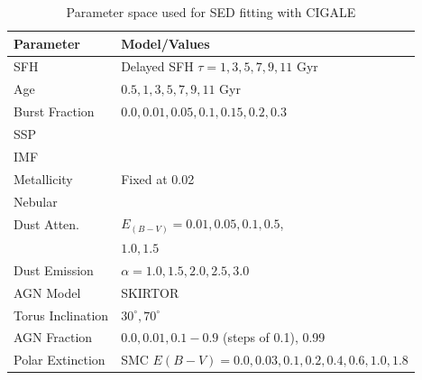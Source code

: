 \begin{table}[htbp]
    \caption{Parameter space used for SED fitting with CIGALE}
    \label{tab:parameter_space}
    \begin{center}
    \begin{tabular}{ll}
        \toprule
        \textbf{Parameter} & \textbf{Model/Values} \\ 
        \hline
        SFH                 & Delayed SFH $\tau = 1,3,5,7,9,11$ Gyr \\
        Age                 & $0.5, 1, 3, 5, 7, 9, 11$ Gyr \\
        Burst Fraction      & $0.0, 0.01, 0.05, 0.1, 0.15, 0.2, 0.3$ \\
        SSP                 & \cite{bruzual_stellar_2003} \\
        IMF                 & \cite{chabrier_galactic_2003} \\
        Metallicity         & Fixed at 0.02 \\
        Nebular             & \cite{inoue_rest-frame_2011} \\
        Dust Atten.         & \cite{calzetti_dust_2000} $E_{(B-V)} = 0.01, 0.05, 0.1, 0.5$, \\
                            & $1.0, 1.5$ \\
        Dust Emission       & \cite{dale_two-parameter_2014} $\alpha = 1.0, 1.5, 2.0, 2.5, 3.0$ \\
        AGN Model           & SKIRTOR \citep{stalevski_3d_2012, stalevski_dust_2016} \\
        Torus Inclination   & $30^\circ, 70^\circ$ \\
        AGN Fraction        & $0.0, 0.01, 0.1 - 0.9$ (steps of 0.1), 0.99 \\
        Polar Extinction    & SMC $E(B-V) = 0.0, 0.03, 0.1, 0.2, 0.4, 0.6, 1.0, 1.8$ \\
        \bottomrule
    \end{tabular}
    \end{center}
\end{table}

